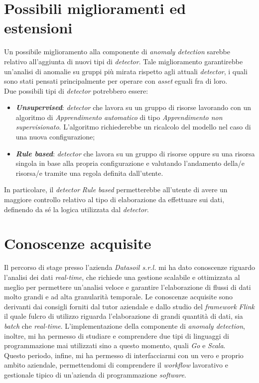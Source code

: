 \section{Possibili miglioramenti ed estensioni}
Un possibile miglioramento alla componente di \textit{anomaly detection} sarebbe relativo all'aggiunta di nuovi tipi di \textit{detector}. Tale miglioramento garantirebbe un'analisi di anomalie su gruppi più mirata rispetto agli attuali \textit{detector}, i quali sono stati pensati principalmente per operare con \textit{asset} eguali fra di loro.\\
Due possibili tipi di \textit{detector} potrebbero essere:
\begin{itemize}
	\item{\textbf{\textit{Unsupervised}}: \textit{detector} che lavora su un gruppo di risorse lavorando con un algoritmo di \textit{\gls{Apprendimento automatico}} di tipo \textit{\gls{Apprendimento non supervisionato}}. L'algoritmo richiederebbe un ricalcolo del modello nel caso di una nuova configurazione;}
	\item{\textbf{\textit{Rule based}}: \textit{detector} che lavora su un gruppo di risorse oppure su una risorsa singola in base alla propria configurazione e valutando l'andamento della/e risorsa/e tramite una regola definita dall'utente.}
\end{itemize}
In particolare, il \textit{detector} \textit{Rule based} permetterebbe all'utente di avere un maggiore controllo relativo al tipo di elaborazione da effettuare sui dati, definendo da sé la logica utilizzata dal \textit{detector}.



\section{Conoscenze acquisite}
Il percorso di stage presso l'azienda \textit{Datasoil s.r.l.} mi ha dato conoscenze riguardo l'analisi dei dati \textit{real-time}, che richiede una gestione scalabile e ottimizzata al meglio per permettere un'analisi veloce e garantire l'elaborazione di flussi di dati molto grandi e ad alta granularità temporale. Le conoscenze acquisite sono derivanti dai consigli forniti dal tutor aziendale e dallo studio del \textit{\textit{\gls{framework}}} \textit{Flink} il quale fulcro di utilizzo riguarda l'elaborazione di grandi quantità di dati, sia \textit{batch} che \textit{real-time}. L'implementazione della componente di \textit{anomaly detection}, inoltre, mi ha permesso di studiare e comprendere due tipi di linguaggi di programmazione mai utilizzati sino a questo momento, quali \textit{Go} e \textit{Scala}.\\
Questo periodo, infine, mi ha permesso di interfacciarmi con un vero e proprio ambito aziendale, permettendomi di comprendere il \textit{workflow} lavorativo e gestionale tipico di un'azienda di programmazione \textit{software}.

